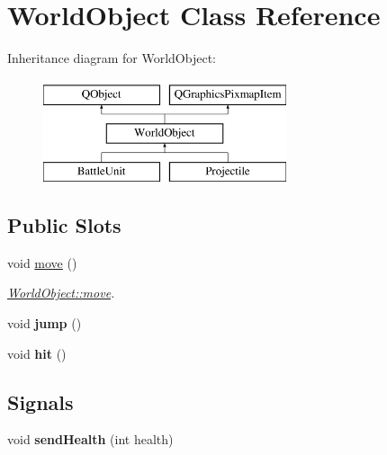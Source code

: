 \hypertarget{class_world_object}{}\section{World\+Object Class Reference}
\label{class_world_object}
Inheritance diagram for World\+Object\+:\begin{figure}[H]
\begin{center}
\leavevmode
\includegraphics[height=3.000000cm]{class_world_object}
\end{center}
\end{figure}
\subsection*{Public Slots}
\begin{DoxyCompactItemize}
\item 
void \hyperlink{class_world_object_af0a581ca569f51047d53677e5d48cf30}{move} ()\hypertarget{class_world_object_af0a581ca569f51047d53677e5d48cf30}{}\label{class_world_object_af0a581ca569f51047d53677e5d48cf30}

\begin{DoxyCompactList}\small\item\em \hyperlink{class_world_object_af0a581ca569f51047d53677e5d48cf30}{World\+Object\+::move}. \end{DoxyCompactList}\item 
void {\bfseries jump} ()\hypertarget{class_world_object_a923e9f81e48251574f1b69f09ebc1c12}{}\label{class_world_object_a923e9f81e48251574f1b69f09ebc1c12}

\item 
void {\bfseries hit} ()\hypertarget{class_world_object_a5630a513886f232da0174fc992a13ad7}{}\label{class_world_object_a5630a513886f232da0174fc992a13ad7}

\end{DoxyCompactItemize}
\subsection*{Signals}
\begin{DoxyCompactItemize}
\item 
void {\bfseries send\+Health} (int health)\hypertarget{class_world_object_a92ca617192f2b07350e947056e67b15a}{}\label{class_world_object_a92ca617192f2b07350e947056e67b15a}

\end{DoxyCompactItemize}

